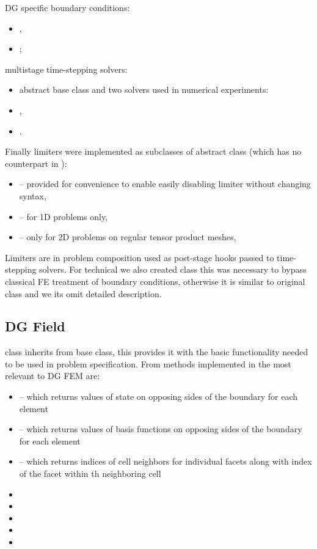 DG specific boundary conditions:
\begin{itemize}
    \item {},
    \item {};
\end{itemize}
multistage time-stepping solvers: 
\begin{itemize}
    \item abstract base class  and two solvers used in numerical experiments:
    \item {},
    \item {}.
\end{itemize}
Finally limiters were implemented as subclasses of  abstract class (which has no 
counterpart in \sfepy{}):
\begin{itemize}
    \item {} -- provided for convenience to enable 
    easily disabling limiter without changing 
    syntax,
    \item {} -- for 1D problems only,
    \item {} -- only for 2D problems on regular tensor 
    product 
    meshes,
\end{itemize} 
Limiters are in problem composition used as post-stage hooks passed to time-stepping solvers. For 
technical we also created  class this was necessary to bypass classical FE 
treatment of boundary conditions, otherwise it is similar to original \sfepy{}  
class and we its omit detailed description.


\subsection{DG Field}
 class inherits from  base class, this provides it with the basic 
functionality needed to be used in problem specification. From methods implemented in 
 the most relevant to DG FEM are:
\begin{itemize}
    \item {} -- which returns values of state on opposing sides of 
    the boundary for each element
    \item {} -- which returns values of basis functions on opposing 
    sides of the boundary for each element
    \item {} -- which returns indices of cell neighbors for individual 
    facets along with index of the facet within th neighboring cell 
    \item {}
    \item {}
    \item {}
    \item {}
    \item {}
\end{itemize}

